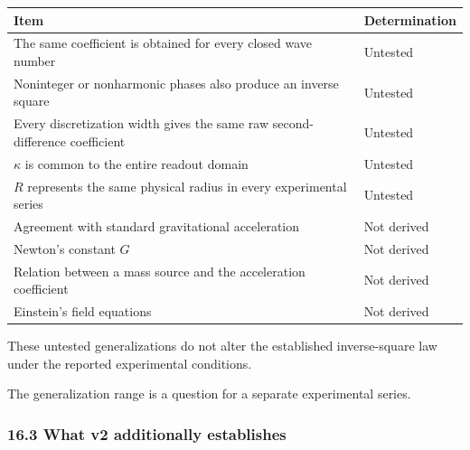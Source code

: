 \documentclass[
  a4paper,
]{article}
\newcounter{none} %
\begin{document}
{\def\LTcaptype{none} %
\begin{longtable}[]{@{}
  >{\raggedright\arraybackslash}p{}
  >{\raggedright\arraybackslash}p{}@{}}
\toprule\noalign{}
\begin{minipage}[b]{\linewidth}\raggedright
Item
\end{minipage} & \begin{minipage}[b]{\linewidth}\raggedright
Determination
\end{minipage} \\
\midrule\noalign{}
\endhead
\bottomrule\noalign{}
\endlastfoot
The same coefficient is obtained for every closed wave number &
Untested \\
Noninteger or nonharmonic phases also produce an inverse square &
Untested \\
Every discretization width gives the same raw second-difference
coefficient & Untested \\
\(\kappa\) is common to the entire readout domain & Untested \\
\(R\) represents the same physical radius in every experimental series &
Untested \\
Agreement with standard gravitational acceleration & Not derived \\
Newton's constant \(G\) & Not derived \\
Relation between a mass source and the acceleration coefficient & Not
derived \\
Einstein's field equations & Not derived \\
\end{longtable}
}

These untested generalizations do not alter the established
inverse-square law under the reported experimental conditions.

The generalization range is a question for a separate experimental
series.

\subsubsection{16.3 What v2 additionally
establishes}\label{what-v2-additionally-establishes}
\end{document}
